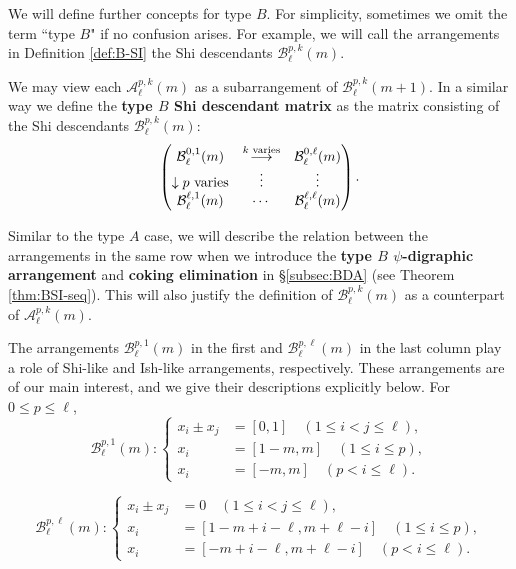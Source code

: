 \documentclass[11pt]{article}
\theoremstyle{definition}
\numberwithin{equation}{section}
\newcommand{\A}{\mathcal{A}}
\newcommand{\B}{\mathcal{B}}
\newcommand{\tbf}{\textbf}
\begin{document}
We will  define further concepts for type $B$. 
For simplicity, sometimes we omit the term ``type $B$" if no confusion arises. 
For example, we will call the arrangements in Definition \ref{def:B-SI} the Shi  descendants $\B^{p,k}_\ell(m)$. 

We may view each $\A^{p,k}_\ell(m)$ as a subarrangement of  $\B^{p,k}_\ell(m+1)$.
In a similar way we define the  \tbf{type $B$ Shi descendant matrix} as the matrix consisting of the  Shi  descendants $\B^{p,k}_\ell(m)$:
$$
\begin{pmatrix}
    \B^{0,1}_\ell(m)& \overset{\text{\scriptsize{$k$ varies}}}{\longrightarrow} & \B^{0,\ell}_\ell(m)\\
\downarrow    \text{\scriptsize{$p$ varies}}  & \vdots  & \vdots  \\
\B^{\ell,1}_\ell(m) & \cdots & \B^{\ell,\ell}_\ell(m) 
          \end{pmatrix}.
       $$
      
  Similar to the type $A$ case, we will describe the relation between the arrangements in the same row when we introduce the  \tbf{type $B$ $\psi$-digraphic arrangement} and \tbf{coking elimination} in \S\ref{subsec:BDA} (see Theorem \ref{thm:BSI-seq}). 
  This will also justify the definition of  $\B^{p,k}_\ell(m)$ as a counterpart of $\A^{p,k}_\ell(m)$.


The arrangements $\B^{p,1}_\ell(m)$ in the first and  $\B^{p,\ell}_\ell(m)$ in the last column play a role of Shi-like and Ish-like arrangements, respectively. 
These arrangements are of our main interest, and we give their descriptions explicitly below. 
For $0 \le p \le \ell$,
\begin{equation}
\label{eq:1stcol}
  \B^{p,1}_\ell(m): 
\begin{cases}
x_{i}\pm x_{j} &= [0 , 1]\quad  (1 \leq i < j \leq \ell), \\
x_i&=  [1-m , m] \quad (1 \leq   i \leq p), \\
x_i&=[-m , m]  \quad (p<  i \leq \ell).
\end{cases}
\end{equation}

\begin{equation}
\label{eq:lastcol}
  \B^{p,\ell}_\ell(m):
  \begin{cases}
x_{i}\pm x_{j} &= 0\quad  (1 \leq i < j \leq \ell), \\
x_i&=  [1-m+i-\ell , m+\ell-i] \quad (1 \leq   i \leq p), \\
x_i&=  [-m+i-\ell , m+\ell-i]   \quad (p<  i \leq \ell).
\end{cases}
\end{equation}
\end{document}
